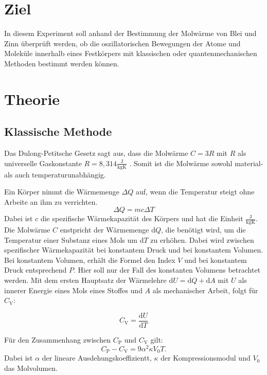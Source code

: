 \section{Ziel}
\label{sec:ziel}
In diesem Experiment soll anhand der Bestimmung der Molwärme von Blei und Zinn überprüft werden, ob die oszillatorischen Bewegungen der Atome und Moleküle innerhalb eines Festkörpers mit klassischen oder quantenmechanischen Methoden bestimmt werden können.

\section{Theorie}
\label{sec:theorie}

 \subsection{Klassische Methode}
Das Dulong-Petitsche Gesetz sagt aus, dass die Molwärme $C = 3R$ mit $R$ als universelle Gaskonstante $R = 8,314 \frac{\si{\joule}}{\si{\kilogram \kelvin}}$ \cite{codata}. Somit ist die Molwärme sowohl material- als auch temperaturunabhängig.

Ein Körper nimmt die Wärmemenge $\Delta Q$ auf, wenn die Temperatur steigt ohne Arbeite an ihm zu verrichten.
\begin{equation}
  \Delta Q = mc \Delta T
\end{equation}
Dabei ist $c$ die spezifische Wärmekapazität des Körpers und hat die Einheit $\frac{\si{\joule}}{\si{\kilogram \kelvin}}$.
Die Molwärme $C$ enstpricht der Wärmemenge $\mathrm{d}Q$, die benötigt wird, um die Temperatur einer Substanz eines Mols um $\mathrm{d}T$ zu erhöhen. Dabei wird zwischen spezifischer Wärmekapazität bei konstantem Druck und bei konstantem Volumen. Bei konstantem Volumen, erhält die Formel den Index $V$ und bei konstantem Druck entsprechend $P$. Hier soll nur der Fall des konstanten Volumens betrachtet werden.
Mit dem ersten Hauptsatz der Wärmelehre $\mathrm{d}U = \mathrm{d}Q + \mathrm{d}A$ mit $U$ als innerer Energie eines Mols eines Stoffes und $A$ als mechanischer Arbeit, folgt für $C_\mathrm{V}$:

\begin{equation}
  C_\mathrm{V} = \frac{\mathrm{d}U}{\mathrm{d}T}
\end{equation}

Für den Zusammenhang zwischen $C_\mathrm{P}$ und $C_\mathrm{V}$ gilt:
\begin{equation}
  \label{eqn:CvCp}
  C_\mathrm{P}-C_\mathrm{V} = 9 \alpha^2\kappa V_0 T.
\end{equation}
Dabei ist $\alpha$ der lineare Ausdehungskoeffizientt, $\kappa$ der Kompressionsmodul und $V_0$ das Molvolumen.

